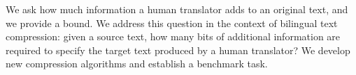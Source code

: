 We ask how much information a human translator adds to an original text, and we provide a bound. We address this question in the context of bilingual text compression: given a source text, how many bits of additional information are required to specify the target text produced by a human translator? We develop new compression algorithms and establish a benchmark task.
